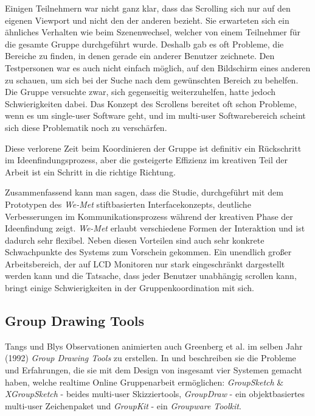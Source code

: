 \medskip Einigen Teilnehmern war nicht ganz klar, dass das Scrolling sich nur auf den eigenen Viewport und nicht den der anderen bezieht. Sie erwarteten sich ein ähnliches Verhalten wie beim Szenenwechsel, welcher von einem Teilnehmer für die gesamte Gruppe durchgeführt wurde. Deshalb gab es oft Probleme, die Bereiche zu finden, in denen gerade ein anderer Benutzer zeichnete. Den Testpersonen war es auch nicht einfach möglich, auf den Bildschirm eines anderen zu schauen, um sich bei der Suche nach dem gewünschten Bereich zu behelfen. Die Gruppe versuchte zwar, sich gegenseitig weiterzuhelfen, hatte jedoch Schwierigkeiten dabei. Das Konzept des Scrollens bereitet oft schon Probleme, wenn es um single-user Software geht, und im multi-user Softwarebereich scheint sich diese Problematik noch zu verschärfen.
	
\medskip Diese verlorene Zeit beim Koordinieren der Gruppe ist definitiv ein Rückschritt im Ideenfindungsprozess, aber die gesteigerte Effizienz im kreativen Teil der Arbeit ist ein Schritt in die richtige Richtung.

\medskip Zusammenfassend kann man sagen, dass die Studie, durchgeführt mit dem Prototypen des \emph{We-Met} stiftbasierten Interfacekonzepts, deutliche Verbesserungen im Kommunikationsprozess während der kreativen Phase der Ideenfindung zeigt. \emph{We-Met} erlaubt verschiedene Formen der Interaktion und ist dadurch sehr flexibel. Neben diesen Vorteilen sind auch sehr konkrete Schwachpunkte des Systems zum Vorschein gekommen. Ein unendlich großer Arbeitsbereich, der auf LCD Monitoren nur stark eingeschränkt dargestellt werden kann und die Tatsache, dass jeder Benutzer unabhängig scrollen kann, bringt einige Schwierigkeiten in der Gruppenkoordination mit sich.

\newpage \subsection{Group Drawing Tools} 
Tangs und Blys Observationen animierten auch Greenberg et al. im selben Jahr (1992) \emph{Group Drawing Tools} zu erstellen. In \citep{Greenberg:1992p207} und \citep{Greenberg:1992p83} beschreiben sie die Probleme und Erfahrungen, die sie mit dem Design von insgesamt vier Systemen gemacht haben, welche realtime Online Gruppenarbeit ermöglichen: \emph{GroupSketch} \& \emph{XGroupSketch} - beides multi-user Skizziertools, \emph{GroupDraw} - ein objektbasiertes multi-user Zeichenpaket und \emph{GroupKit} - ein \emph{Groupware Toolkit}.

